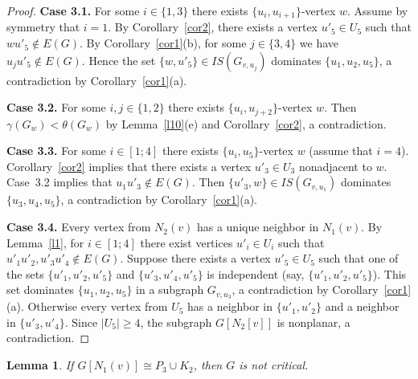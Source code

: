 \documentclass[12pt]{article}
\newtheorem{lemma}{Lemma}
\begin{document}
\begin{proof}
\textbf{Case 3.1.} For some $i \in \{1,3\}$ there exists $\{u_i,u_{i+1}\}$-vertex $w$. Assume by symmetry that $i = 1$. By Corollary~\ref{cor2}, there exists a vertex $u'_5 \in U_5$ such that $wu'_5 \notin E(G)$. By Corollary~\ref{cor1}(b), for some $j \in \{3,4\}$ we have $u_ju'_5 \notin E(G)$. Hence the set $\{w,u'_5\} \in IS(G_{v,u_j})$ dominates $\{u_1,u_2,u_5\}$, a contradiction by Corollary~\ref{cor1}(a). 

\textbf{Case 3.2.} For some $i,j \in \{1,2\}$ there exists $\{u_i,u_{j+2}\}$-vertex $w$. Then $\gamma(G_w) < \theta(G_w)$ by Lemma~\ref{l10}(e) and Corollary~\ref{cor2}, a contradiction.

\textbf{Case 3.3.} For some $i \in [1;4]$ there exists $\{u_i,u_5\}$-vertex $w$ (assume that $i = 4$). Corollary~\ref{cor2} implies that there exists a vertex $u'_3 \in U_3$ nonadjacent to $w$. Case~3.2 implies that $u_1u'_3 \notin E(G)$. Then $\{u'_3,w\} \in IS(G_{v,u_1})$ dominates $\{u_3,u_4,u_5\}$, a contradiction by Corollary~\ref{cor1}(a).

\textbf{Case 3.4.} Every vertex from $N_2(v)$ has a unique neighbor in $N_1(v)$. By Lemma~\ref{l1}, for $i \in [1;4]$ there exist vertices $u'_i \in U_i$ such that $u'_1u'_2,u'_3u'_4 \notin E(G)$. Suppose there exists a vertex $u'_5 \in U_5$ such that one of the sets $\{u'_1,u'_2,u'_5\}$ and $\{u'_3,u'_4,u'_5\}$ is independent (say, $\{u'_1,u'_2,u'_5\}$). This set dominates $\{u_1,u_2,u_5\}$ in a subgraph $G_{v,u_3}$, a contradiction by Corollary~\ref{cor1}(a). Otherwise every vertex from $U_5$ has a neighbor in $\{u'_1,u'_2\}$ and a neighbor in $\{u'_3,u'_4\}$. Since $|U_5| \geq 4$, the subgraph $G[N_2[v]]$ is nonplanar, a contradiction.
\end{proof}




\begin{lemma}\label{l38}
If $G[N_1(v)] \cong P_3 \cup K_2$, then $G$ is not critical.
\end{lemma}
\end{document}
